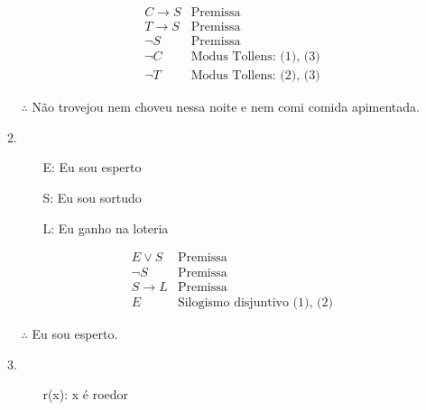 \documentclass[leqno]{article} %
\begin{document}
\begin{enumerate}
\begin{enumerate}
                \setcounter{equation}{0}%
                \begin{align}
                     &C \to S &\textrm{Premissa} \\
                     &T \to S&\textrm{Premissa} \\
                     &\neg S &\textrm{Premissa} \\
                     &\neg C &\textrm{Modus Tollens: (1), (3)} \\
                     &\neg T &\textrm{Modus Tollens: (2), (3)}
                \end{align}

                \( \therefore \) Não trovejou nem choveu nessa noite e nem comi comida apimentada.

            \item

                \begin{itemize}

                    \item[E:] Eu sou esperto

                    \item[S:] Eu sou sortudo

                    \item[L:] Eu ganho na loteria

                \end{itemize}

                \setcounter{equation}{0}%
                \begin{align}
                     &E \lor S &\textrm{Premissa} \\
                     &\neg S &\textrm{Premissa} \\
                     &S \to L&\textrm{Premissa} \\
                     &E &\textrm{Silogismo disjuntivo (1), (2)}
                \end{align}

                \( \therefore \) Eu sou esperto.

            \item

                \begin{itemize}

                    \item[r(x):] x é roedor


\end{itemize}
\end{enumerate}
\end{enumerate}
\end{document}
